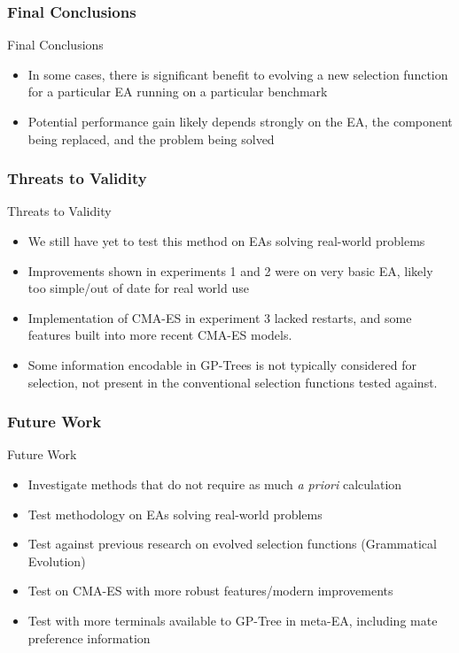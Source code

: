 \documentclass{beamer}
\begin{document}
	\begin{frame}
		\frametitle{Final Conclusions}
		Final Conclusions
		\begin{itemize}
			 \item<1-|alert@1> In some cases, there is significant benefit to evolving a new selection function for a particular EA running on a particular benchmark
			 \item<2-|alert@2> Potential performance gain likely depends strongly on the EA, the component being replaced, and the problem being solved		 
		\end{itemize}
	\end{frame} 		
	
	\begin{frame}
		\frametitle{Threats to Validity}
		Threats to Validity
		\begin{itemize}
			 \item<1-|alert@1> We still have yet to test this method on EAs solving real-world problems
			 \item<2-|alert@2> Improvements shown in experiments 1 and 2 were on very basic EA, likely too simple/out of date for real world use	 
			 \item<3-|alert@3> Implementation of CMA-ES in experiment 3 lacked restarts, and some features built into more recent CMA-ES models.	 	
			 \item<4-|alert@4> Some information encodable in GP-Trees is not typically considered for selection, not present in the conventional selection functions tested against.	 					  
		\end{itemize}
	\end{frame} 
	
	\begin{frame}
		\frametitle{Future Work}
		Future Work
		\begin{itemize}
			 \item<1-|alert@1> Investigate methods that do not require as much \textit{a priori} calculation
			 \item<2-|alert@2> Test methodology on EAs solving real-world problems	 
			 \item<3-|alert@3> Test against previous research on evolved selection functions (Grammatical Evolution)	 	
			 \item<4-|alert@4> Test on CMA-ES with more robust features/modern improvements
			 \item<5-|alert@5> Test with more terminals available to GP-Tree in meta-EA, including mate preference information
		\end{itemize}
	\end{frame} 				
 
\end{document}
